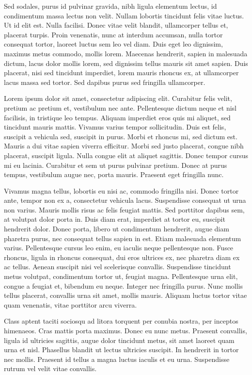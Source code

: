Sed sodales, purus id pulvinar gravida, nibh ligula elementum lectus, id condimentum massa lectus non velit. Nullam lobortis tincidunt felis vitae luctus. Ut id elit est. Nulla facilisi. Donec vitae velit blandit, ullamcorper tellus et, placerat turpis. Proin venenatis, nunc at interdum accumsan, nulla tortor consequat tortor, laoreet luctus sem leo vel diam. Duis eget leo dignissim, maximus metus commodo, mollis lorem. Maecenas hendrerit, sapien in malesuada dictum, lacus dolor mollis lorem, sed dignissim tellus mauris sit amet sapien. Duis placerat, nisi sed tincidunt imperdiet, lorem mauris rhoncus ex, at ullamcorper lacus massa sed tortor. Sed dapibus purus sed fringilla ullamcorper.


Lorem ipsum dolor sit amet, consectetur adipiscing elit. Curabitur felis velit, pretium ac pretium et, vestibulum nec ante. Pellentesque dictum neque et nisl facilisis, in tristique leo tempus. Aliquam imperdiet eros quis mi aliquet, sed tincidunt mauris mattis. Vivamus varius tempor sollicitudin. Duis est felis, suscipit a vehicula sed, suscipit in purus. Morbi et rhoncus mi, sed dictum est. Mauris a dui vitae sapien viverra efficitur. Morbi sed justo placerat, congue nibh placerat, suscipit ligula. Nulla congue elit at aliquet sagittis. Donec tempor cursus mi eu lacinia. Curabitur et sem ut purus pulvinar pretium. Donec at purus tempus, vestibulum augue nec, porta mauris. Praesent eget fringilla nunc.

Vivamus magna tellus, lobortis eu nisi ac, commodo fringilla nisi. Donec tortor ante, tempor non ex a, consectetur vehicula lacus. Suspendisse consequat ut urna non varius. Mauris mollis risus ac felis feugiat mattis. Sed porttitor dapibus sem, at volutpat dolor porta in. Duis diam erat, imperdiet at tortor eu, suscipit hendrerit dolor. Donec porta, libero ut condimentum hendrerit, augue diam pharetra purus, nec consequat tellus sapien in est. Etiam malesuada elementum varius. Pellentesque cursus leo enim, eu iaculis neque pellentesque non. Fusce rhoncus, ligula in rhoncus consequat, dui eros ultrices ex, nec pharetra diam ex ac tellus. Aenean suscipit nisi vel scelerisque convallis. Suspendisse tincidunt metus volutpat, condimentum tortor ut, feugiat magna. Pellentesque urna elit, congue a feugiat et, bibendum eu neque. Integer nec fringilla purus. Nunc mollis tellus placerat, convallis urna sit amet, mollis mauris. Aliquam luctus tortor vitae quam venenatis, vitae porttitor arcu viverra.

Class aptent taciti sociosqu ad litora torquent per conubia nostra, per inceptos himenaeos. Cras mattis porta maximus. Donec eu nunc metus. Praesent convallis, ligula id ultricies sagittis, augue dolor tincidunt metus, sit amet laoreet quam urna et nisl. Phasellus blandit ut lectus ultricies suscipit. In hendrerit in tortor nec mollis. Praesent id tellus a magna luctus iaculis et eu urna. Suspendisse rutrum vel velit vitae convallis.

